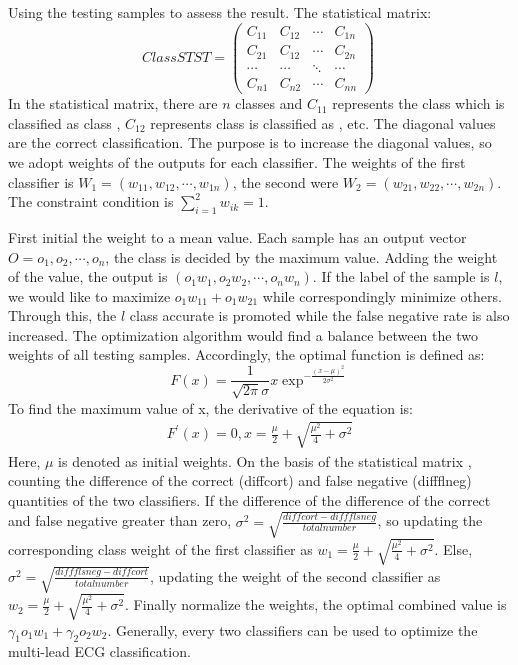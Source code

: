 \documentclass{bmcart}
\begin{document}
Using the testing samples to assess the result. The statistical matrix:
\begin{equation}
ClassSTST = \left(
\begin{array}{cccc}
 C_{11} & C_{12} & \cdots & C_{1n}\\
 C_{21} & C_{12} & \cdots & C_{2n}\\
 \cdots & \cdots & \ddots & \cdots\\
 C_{n1} & C_{n2} & \cdots & C_{nn}
\end{array}
\right)~
\end{equation}
In the statistical matrix, there are $n$ classes and $C_{11}$ represents the class \uppercase\expandafter{} which is classified as class \uppercase\expandafter{}, $C_{12}$ represents class \uppercase\expandafter{} is classified as \uppercase\expandafter{}, etc. 
The diagonal values are the correct classification. The purpose is to increase the diagonal values, so we adopt weights of the outputs for each classifier. 
The weights of the first classifier is $W_1 = (w_{11}, w_{12}, \cdots, w_{1n})$, the second were $W_2 = (w_{21}, w_{22}, \cdots, w_{2n})$. The constraint condition is $\sum\nolimits_{i=1}^2{w_{ik}} = 1$. 

First initial the weight to a mean value. Each sample has an output vector $O = {o_1, o_2, \cdots, o_n}$, the class is decided by the maximum value. Adding the weight of the value, the output is $(o_1w_1 ,o_2w_2, \cdots, o_nw_n)$. If the label of the sample is $l$, we would like to maximize $o_1w_{11} + o_1w_{21}$ while correspondingly minimize others. Through this, the $l$ class accurate is promoted while the false negative rate is also increased. The optimization algorithm would find a balance between the two weights of all testing samples. Accordingly, the optimal function is defined as:
\begin{equation}
F(x) = \frac{1}{\sqrt{2\pi}\sigma}x\exp^{-\frac{(x-\mu)^2}{2\sigma^2}}
\end{equation}
To find the maximum value of x, the derivative of the equation is:
\begin{equation}
\begin{split}
F^{'}(x) = 0, x = \frac{\mu}{2}+\sqrt{\frac{\mu^2}{4}+\sigma^2}
\end{split}
\end{equation}
Here, $\mu$ is denoted as initial weights. On the basis of the statistical matrix , counting the difference of the correct (diffcort) and false negative (diffflneg) quantities of the two classifiers. If the difference of the difference of the correct and false negative greater than zero, $\sigma^2 = \sqrt{\frac{diffcort - diffflsneg}{totalnumber}}$, so updating the corresponding class weight of the first classifier as $w_1 = \frac{\mu}{2}+\sqrt{\frac{\mu^2}{4}+\sigma^2}$. Else, $\sigma^2 = \sqrt{\frac{diffflsneg - diffcort}{totalnumber}}$, updating the weight of the second classifier as $w_2 = \frac{\mu}{2}+\sqrt{\frac{\mu^2}{4}+\sigma^2}$. Finally normalize the weights, the optimal combined value is $\gamma_1o_1w_1 + \gamma_2o_2w_2$. Generally, every two classifiers can be used to optimize the multi-lead ECG classification.
\end{document}
